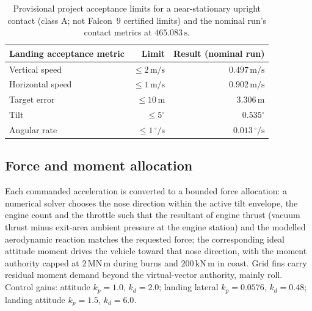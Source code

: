 \begin{table}[htbp]
\centering
\begin{tabular}{lrr}
\toprule
Landing acceptance metric & Limit & Result (nominal run) \\
\midrule
Vertical speed & $\le 2\,\mathrm{m/s}$ & $0.497\,\mathrm{m/s}$ \\
Horizontal speed & $\le 1\,\mathrm{m/s}$ & $0.902\,\mathrm{m/s}$ \\
Target error & $\le 10\,\mathrm{m}$ & $3.306\,\mathrm{m}$ \\
Tilt & $\le 5^{\circ}$ & $0.535^{\circ}$ \\
Angular rate & $\le 1\,^{\circ}/\mathrm{s}$ & $0.013\,^{\circ}/\mathrm{s}$ \\
\bottomrule
\end{tabular}
\caption{Provisional project acceptance limits for a near-stationary
upright contact (class A; not Falcon~9 certified limits) and the nominal
run's contact metrics at $465.083\,\mathrm{s}$.}
\label{tab:landing-limits}
\end{table}

\subsection{Force and moment allocation}

Each commanded acceleration is converted to a bounded force allocation:
a numerical solver chooses the nose direction within the active tilt
envelope, the engine count and the throttle such that the resultant of
engine thrust (vacuum thrust minus exit-area ambient pressure at the
engine station) and the modelled aerodynamic reaction matches the
requested force; the corresponding ideal attitude moment drives the
vehicle toward that nose direction, with the moment authority capped at
$2\,\mathrm{MN\,m}$ during burns and $200\,\mathrm{kN\,m}$ in coast. Grid
fins carry residual moment demand beyond the virtual-vector authority,
mainly roll. Control gains: attitude $k_p = 1.0$,
$k_d = 2.0$; landing lateral $k_p = 0.0576$, $k_d = 0.48$; landing
attitude $k_p = 1.5$, $k_d = 6.0$.

